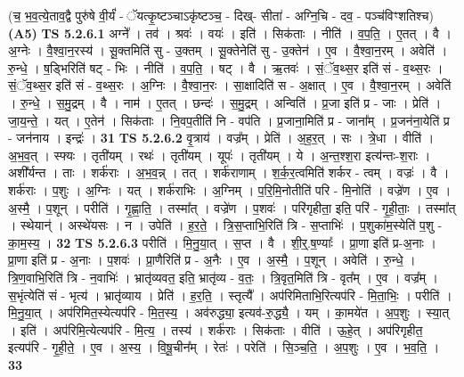 \documentclass[17pt]{extarticle}
\begin{document}
                  \newline
                      (च॒ भ॒व॒त्ये॒ताव॒द्वै पुरु॑षे वी॒र्यं॑ - ॅयत्कृ॒ष्टञ्चाऽकृ॑ष्टञ्च॒ - दिख्- सीता॑ - अग्नि॒चि - दव॒ - पञ्च॑विꣳशतिश्च)  \textbf{(A5)} \newline \newline
                                \textbf{ TS 5.2.6.1} \newline
                  अग्ने᳚ । तव॑ । श्रवः॑ । वयः॑ । इति॑ । सिक॑ताः । नीति॑ । व॒प॒ति॒ । ए॒तत् । वै । अ॒ग्नेः । वै॒श्वा॒न॒रस्य॑ । सू॒क्तमिति॑ सु - उ॒क्तम् । सू॒क्तेनेति॑ सु - उ॒क्तेन॑ । ए॒व । वै॒श्वा॒न॒रम् । अवेति॑ । रु॒न्धे॒ । ष॒ड्भिरिति॑ षट् - भिः । नीति॑ । व॒प॒ति॒ । षट् । वै । ऋ॒तवः॑ । सं॒ॅव॒थ्स॒र इति॑ सं - व॒थ्स॒रः । सं॒ॅव॒थ्स॒र इति॑ सं - व॒थ्स॒रः । अ॒ग्निः । वै॒श्वा॒न॒रः । सा॒क्षादिति॑ स - अ॒क्षात् । ए॒व । वै॒श्वा॒न॒रम् । अवेति॑ । रु॒न्धे॒ । स॒मु॒द्रम् । वै । नाम॑ । ए॒तत् । छन्दः॑ । स॒मु॒द्रम् । अन्विति॑ । प्र॒जा इति॑ प्र - जाः । प्रेति॑ । जा॒य॒न्ते॒ । यत् । ए॒तेन॑ । सिक॑ताः । नि॒वप॒तीति॑ नि - वप॑ति । प्र॒जाना॒मिति॑ प्र - जाना᳚म् । प्र॒जन॑ना॒येति॑ प्र - जन॑नाय । इन्द्रः॑ । \textbf{  31} \newline
                  \newline
                                \textbf{ TS 5.2.6.2} \newline
                  वृ॒त्राय॑ । वज्र᳚म् । प्रेति॑ । अ॒ह॒र॒त् । सः । त्रे॒धा । वीति॑ । अ॒भ॒व॒त् । स्फ्यः । तृती॑यम् । रथः॑ । तृती॑यम् । यूपः॑ । तृती॑यम् । ये । अ॒न्त॒श्श॒रा इत्य॑न्तः-श॒राः । अशी᳚र्यन्त । ताः । शर्क॑राः । अ॒भ॒व॒न्न् । तत् । शर्क॑राणाम् । श॒र्क॒र॒त्वमिति॑ शर्कर - त्वम् । वज्रः॑ । वै । शर्क॑राः । प॒शुः । अ॒ग्निः । यत् । शर्क॑राभिः । अ॒ग्निम् । प॒रि॒मि॒नोतीति॑ परि - मि॒नोति॑ । वज्रे॑ण । ए॒व । अ॒स्मै॒ । प॒शून् । परीति॑ । गृ॒ह्णा॒ति॒ । तस्मा᳚त् । वज्रे॑ण । प॒शवः॑ । परि॑गृहीता॒ इति॒ परि॑ - गृ॒ही॒ताः॒ । तस्मा᳚त् । स्थेयान्॑ । अस्थे॑यसः । न । उपेति॑ । ह॒र॒ते॒ । त्रि॒स॒प्ताभि॒रिति॑ त्रि - स॒प्ताभिः॑ । प॒शुका॑म॒स्येति॑ प॒शु - का॒म॒स्य॒ । \textbf{  32} \newline
                  \newline
                                \textbf{ TS 5.2.6.3} \newline
                  परीति॑ । मि॒नु॒या॒त् । स॒प्त । वै । शी॒र्॒.ष॒ण्याः᳚ । प्रा॒णा इति॑ प्र-अ॒नाः । प्रा॒णा इति॑ प्र - अ॒नाः । प॒शवः॑ । प्रा॒णैरिति॑ प्र - अ॒नैः । ए॒व । अ॒स्मै॒ । प॒शून् । अवेति॑ । रु॒न्धे॒ । त्रि॒ण॒वाभि॒रिति॑ त्रि - न॒वाभिः॑ । भ्रातृ॑व्यवत॒ इति॒ भ्रातृ॑व्य - व॒तः॒ । त्रि॒वृत॒मिति॑ त्रि - वृत᳚म् । ए॒व । वज्र᳚म् । स॒भृंत्येति॑ सं - भृत्य॑ । भ्रातृ॑व्याय । प्रेति॑ । ह॒र॒ति॒ । स्तृत्यै᳚ । अप॑रिमिताभि॒रित्यप॑रि - मि॒ता॒भिः॒ । परीति॑ । मि॒नु॒या॒त् । अप॑रिमित॒स्येत्यप॑रि - मि॒त॒स्य॒ । अव॑रुद्ध्या॒ इत्यव॑-रु॒द्ध्यै॒ । यम् । का॒मये॑त । अ॒प॒शुः । स्या॒त् । इति॑ । अप॑रिमि॒त्येत्यप॑रि - मि॒त्य॒ । तस्य॑ । शर्क॑राः । सिक॑ताः । वीति॑ । ऊ॒हे॒त् । अप॑रिगृहीत॒ इत्यप॑रि - गृ॒ही॒ते॒ । ए॒व । अ॒स्य॒ । वि॒षू॒चीन᳚म् । रेतः॑ । परेति॑ । सि॒ञ्च॒ति॒ । अ॒प॒शुः । ए॒व । भ॒व॒ति॒ । \textbf{  33} \newline
\end{document}
